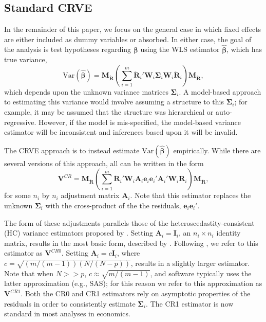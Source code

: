 \documentclass[12pt]{article}\usepackage[]{graphicx}\usepackage[]{color}
\newcommand{\Var}{\text{Var}}
\newcommand{\bm}{\mathbf}
\newcommand{\bs}{\boldsymbol}
\begin{document}
\subsection{Standard CRVE}


In the remainder of this paper, we focus on the general case in which fixed effects are either included as dummy variables or absorbed. 
In either case, the goal of the analysis is test hypotheses regarding $\bs\beta$ using the WLS estimator $\bs{\hat\beta}$, which has true variance,
\begin{equation}
\label{eq:var_WLS}
\Var\left(\bs{\hat\beta}\right) = \bm{M_{\ddot{R}}}\left(\sum_{i=1}^m \bm{\ddot{R}}_i' \bm{W}_i \bs\Sigma_i \bm{W}_i\bm{\ddot{R}}_i\right) \bm{M_{\ddot{R}}},
\end{equation}
which depends upon the unknown variance matrices $\bm\Sigma_i$. 
A model-based approach to estimating this variance would involve assuming a structure to this $\bm\Sigma_i$; for example, it may be assumed that the structure was hierarchical or auto-regressive. 
However, if the model is mis-specified, the model-based variance estimator will be inconsistent and inferences based upon it will be invalid.

The CRVE approach is to instead estimate $\Var\left(\bs{\hat\beta}\right)$ empirically. 
While there are several versions of this approach, all can be written in the form
\begin{equation}
\label{eq:V_small}
\bm{V}^{CR} = \bm{M_{\ddot{R}}}\left(\sum_{i=1}^m \bm{\ddot{R}}_i'\bm{W}_i \bm{A}_i \bm{e}_i \bm{e}_i' \bm{A}_i' \bm{W}_i \bm{\ddot{R}}_i\right) \bm{M_{\ddot{R}}},
\end{equation}
for some $n_i$ by $n_i$ adjustment matrix $\bm{A}_i$. 
Note that this estimator replaces the unknown $\bm\Sigma_i$ with the cross-product of the the residuals, $\bm{e}_i \bm{e}_i'$. 

The form of these adjustments parallels those of the heteroscedastity-consistent (HC) variance estimators proposed by \citet*{MacKinnon1985some}. 
Setting $\bm{A}_i = \bm{I}_i$, an $n_i \times n_i$ identity matrix, results in the most basic form, described by \citet{Liang1986longitudinal}. 
Following \citet{Cameron2015practitioners}, we refer to this estimator as $\bm{V}^{CR0}$. 
Setting $\bm{A}_i = c\bm{I}_i$, where $c = \sqrt{(m/(m-1))(N/(N - p))}$, results in a slightly larger estimator.
Note that when $N >> p$, $c \approx \sqrt{m/(m-1)}$, and software typically uses the latter approximation (e.g., SAS); for this reason we refer to this approximation as $\bm{V}^{CR1}$.
Both the CR0 and CR1 estimators rely on asymptotic properties of the residuals in order to consistently estimate $\bs\Sigma_i$. 
The CR1 estimator is now standard in most analyses in economics.
\end{document}
